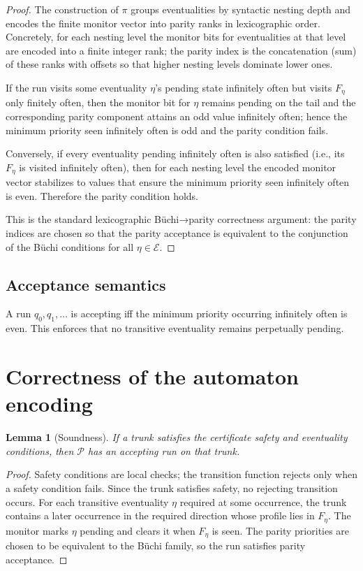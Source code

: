 \documentclass[11pt]{article}
\newtheorem{lemma}[theorem]{Lemma}
\begin{document}
\begin{proof}
The construction of $\pi$ groups eventualities by syntactic nesting depth and
encodes the finite monitor vector into parity ranks in lexicographic order.
Concretely, for each nesting level the monitor bits for eventualities at that
level are encoded into a finite integer rank; the parity index is the
concatenation (sum) of these ranks with offsets so that higher nesting levels
dominate lower ones.

If the run visits some eventuality $\eta$'s pending state infinitely often but
visits $F_\eta$ only finitely often, then the monitor bit for $\eta$ remains
pending on the tail and the corresponding parity component attains an odd
value infinitely often; hence the minimum priority seen infinitely often is
odd and the parity condition fails.

Conversely, if every eventuality pending infinitely often is also satisfied
(i.e., its $F_\eta$ is visited infinitely often), then for each nesting level
the encoded monitor vector stabilizes to values that ensure the minimum
priority seen infinitely often is even. Therefore the parity condition holds.

This is the standard lexicographic Büchi→parity correctness argument: the
parity indices are chosen so that the parity acceptance is equivalent to the
conjunction of the Büchi conditions for all $\eta\in\mathcal{E}$.
\end{proof}


\subsection{Acceptance semantics}
A run $q_0,q_1,\dots$ is accepting iff the minimum priority occurring
infinitely often is even. This enforces that no transitive eventuality remains
perpetually pending.

\section{Correctness of the automaton encoding}
\label{sec:parity-correctness}

\begin{lemma}[Soundness]
If a trunk satisfies the certificate safety and eventuality conditions, then
$\mathcal{P}$ has an accepting run on that trunk.
\end{lemma}

\begin{proof}
Safety conditions are local checks; the transition function rejects only when
a safety condition fails. Since the trunk satisfies safety, no rejecting
transition occurs. For each transitive eventuality $\eta$ required at some
occurrence, the trunk contains a later occurrence in the required direction
whose profile lies in $F_\eta$. The monitor marks $\eta$ pending and clears it
when $F_\eta$ is seen. The parity priorities are chosen to be equivalent to
the Büchi family, so the run satisfies parity acceptance.
\end{proof}
\end{document}
